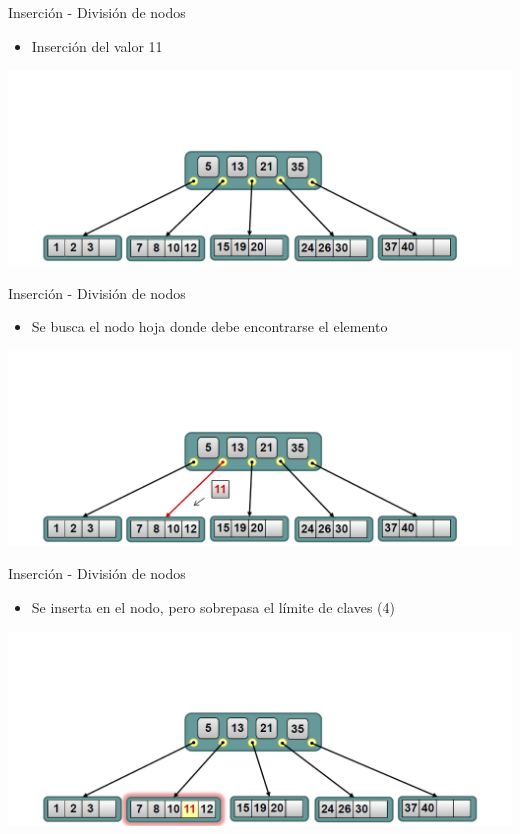 \documentclass[handout]{beamer} %
\begin{document}
\begin{frame}{Inserción - División de nodos}
    \begin{itemize}
        \item Inserción del valor 11
    \end{itemize}
    \begin{center}
        \includegraphics[width=\textwidth]{./image/cap3/b-tree-insert4}
    \end{center}
\end{frame}

\begin{frame}{Inserción - División de nodos}
    \begin{itemize}
        \item Se busca el nodo hoja donde debe encontrarse el elemento
    \end{itemize}
    \begin{center}
        \includegraphics[width=\textwidth]{./image/cap3/b-tree-insert5}
    \end{center}
\end{frame}

\begin{frame}{Inserción - División de nodos}
    \begin{itemize}
        \item Se inserta en el nodo, pero sobrepasa el límite de claves (4)
    \end{itemize}
    \begin{center}
        \includegraphics[width=\textwidth]{./image/cap3/b-tree-insert6}
    \end{center}
\end{frame}
\end{document}
